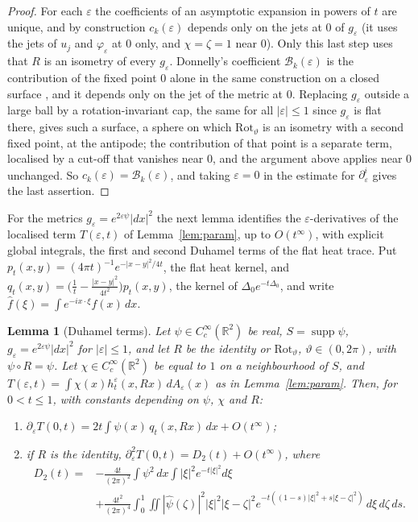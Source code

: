 \documentclass[pdflatex,sn-mathphys-num]{sn-jnl}
\theoremstyle{thmstyleone}%
\newtheorem{lemma}[theorem]{Lemma}%
\theoremstyle{thmstylethree}%
\newcommand{\R}{\mathbb{R}}
\begin{document}
\begin{appendices}
\begin{proof}
For each $\varepsilon$ the coefficients of an asymptotic expansion in powers of $t$ are unique, and by construction $c_k(\varepsilon)$ depends only on the jets at $0$ of $g_\varepsilon$ (it uses the jets of $u_j$ and $\varphi_\varepsilon$ at $0$ only, and $\chi=\zeta=1$ near $0$). Only this last step uses that $R$ is an isometry of every $g_\varepsilon$. Donnelly's coefficient $\mathcal B_k(\varepsilon)$ is the contribution of the fixed point $0$ alone in the same construction on a closed surface \cite{donnelly1976}, and it depends only on the jet of the metric at $0$. Replacing $g_\varepsilon$ outside a large ball by a rotation-invariant cap, the same for all $|\varepsilon|\le1$ since $g_\varepsilon$ is flat there, gives such a surface, a sphere on which $\mathrm{Rot}_\vartheta$ is an isometry with a second fixed point, at the antipode; the contribution of that point is a separate term, localised by a cut-off that vanishes near $0$, and the argument above applies near $0$ unchanged. So $c_k(\varepsilon)=\mathcal B_k(\varepsilon)$, and taking $\varepsilon=0$ in the estimate for $\partial_\varepsilon^i$ gives the last assertion.
\end{proof}

For the metrics $g_\varepsilon=e^{2\varepsilon\psi}|dx|^2$ the next lemma identifies the $\varepsilon$-derivatives of the localised term $T(\varepsilon,t)$ of Lemma~\ref{lem:param}, up to $O(t^\infty)$, with explicit global integrals, the first and second Duhamel terms of the flat heat trace. Put $p_t(x,y)=(4\pi t)^{-1}e^{-|x-y|^2/4t}$, the flat heat kernel, and $q_t(x,y)=\bigl(\frac1t-\frac{|x-y|^2}{4t^2}\bigr)p_t(x,y)$, the kernel of $\Delta_0e^{-t\Delta_0}$, and write $\hat f(\xi)=\int e^{-ix\cdot\xi}f(x)\,dx$.

\begin{lemma}[Duhamel terms]\label{lem:duhamel}
Let $\psi\in C_c^\infty(\R^2)$ be real, $S=\operatorname{supp}\psi$, $g_\varepsilon=e^{2\varepsilon\psi}|dx|^2$ for $|\varepsilon|\le1$, and let $R$ be the identity or $\mathrm{Rot}_\vartheta$, $\vartheta\in(0,2\pi)$, with $\psi\circ R=\psi$. Let $\chi\in C_c^\infty(\R^2)$ be equal to $1$ on a neighbourhood of $S$, and $T(\varepsilon,t)=\int\chi(x)h^\varepsilon_t(x,Rx)\,dA_\varepsilon(x)$ as in Lemma~\ref{lem:param}. Then, for $0<t\le1$, with constants depending on $\psi$, $\chi$ and $R$:
\begin{enumerate}[label=(\roman*)]
\item $\partial_\varepsilon T(0,t)=2t\int\psi(x)\,q_t(x,Rx)\,dx+O(t^\infty)$;
\item if $R$ is the identity, $\partial_\varepsilon^2T(0,t)=D_2(t)+O(t^\infty)$, where
\[
\begin{aligned}
D_2(t)={}&-\frac{4t}{(2\pi)^2}\int\psi^2\,dx\int|\xi|^2e^{-t|\xi|^2}d\xi\\
&+\frac{4t^2}{(2\pi)^4}\int_0^1\!\!\iint|\hat\psi(\zeta)|^2|\xi|^2|\xi-\zeta|^2e^{-t((1-s)|\xi|^2+s|\xi-\zeta|^2)}\,d\xi\,d\zeta\,ds .
\end{aligned}
\]
\end{enumerate}
\end{lemma}


\end{appendices}
\end{document}
